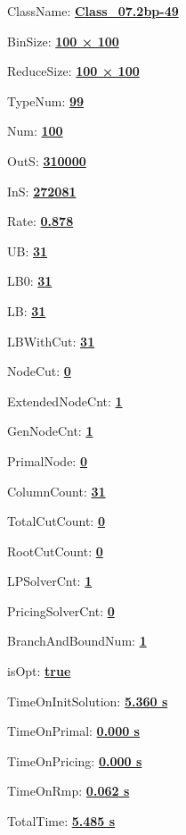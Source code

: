 \documentclass[11pt]{article}
\begin{document}
\pagestyle{empty}


ClassName: \underline{\textbf{Class_07.2bp-49}}
\par
BinSize: \underline{\textbf{100 × 100}}
\par
ReduceSize: \underline{\textbf{100 × 100}}
\par
TypeNum: \underline{\textbf{99}}
\par
Num: \underline{\textbf{100}}
\par
OutS: \underline{\textbf{310000}}
\par
InS: \underline{\textbf{272081}}
\par
Rate: \underline{\textbf{0.878}}
\par
UB: \underline{\textbf{31}}
\par
LB0: \underline{\textbf{31}}
\par
LB: \underline{\textbf{31}}
\par
LBWithCut: \underline{\textbf{31}}
\par
NodeCut: \underline{\textbf{0}}
\par
ExtendedNodeCnt: \underline{\textbf{1}}
\par
GenNodeCnt: \underline{\textbf{1}}
\par
PrimalNode: \underline{\textbf{0}}
\par
ColumnCount: \underline{\textbf{31}}
\par
TotalCutCount: \underline{\textbf{0}}
\par
RootCutCount: \underline{\textbf{0}}
\par
LPSolverCnt: \underline{\textbf{1}}
\par
PricingSolverCnt: \underline{\textbf{0}}
\par
BranchAndBoundNum: \underline{\textbf{1}}
\par
isOpt: \underline{\textbf{true}}
\par
TimeOnInitSolution: \underline{\textbf{5.360 s}}
\par
TimeOnPrimal: \underline{\textbf{0.000 s}}
\par
TimeOnPricing: \underline{\textbf{0.000 s}}
\par
TimeOnRmp: \underline{\textbf{0.062 s}}
\par
TotalTime: \underline{\textbf{5.485 s}}
\par
\newpage


\end{document}
